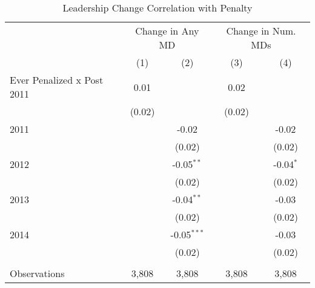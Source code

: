 \begin{table}[htbp]
   \caption{\label{tab:change_analysis} Leadership Change Correlation with Penalty}
   \bigskip
   \centering
   \begin{tabular}{lcccc}
      \toprule
       & \multicolumn{2}{c}{Change in Any MD} & \multicolumn{2}{c}{Change in Num. MDs}\\
                                 & (1)    & (2)           & (3)    & (4)\\  
      \midrule 
      Ever Penalized x Post 2011 & 0.01   &               & 0.02   &   \\   
                                 & (0.02) &               & (0.02) &   \\   
      2011                       &        & -0.02         &        & -0.02\\   
                                 &        & (0.02)        &        & (0.02)\\   
      2012                       &        & -0.05$^{**}$  &        & -0.04$^{*}$\\   
                                 &        & (0.02)        &        & (0.02)\\   
      2013                       &        & -0.04$^{**}$  &        & -0.03\\   
                                 &        & (0.02)        &        & (0.02)\\   
      2014                       &        & -0.05$^{***}$ &        & -0.03\\   
                                 &        & (0.02)        &        & (0.02)\\   
       \\
      Observations               & 3,808  & 3,808         & 3,808  & 3,808\\  
      \bottomrule
   \end{tabular}
\end{table}
